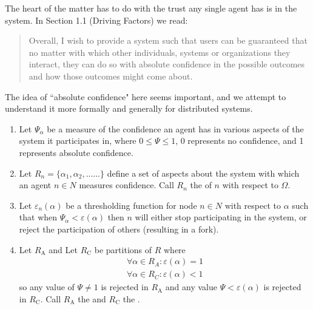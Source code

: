 \documentclass[twocolumn,showpacs,%
  nofootinbib,aps,superscriptaddress,%
  eqsecnum,prd,notitlepage,showkeys,10pt]{revtex4-1}
\begin{document}
The heart of the matter has to do with the trust any single agent has is in the system.  In \cite{yellowpaper} Section 1.1 (Driving Factors) we read:
\begin{quote}
Overall, I wish to provide a system such that users can be guaranteed that no matter with which other individuals, systems or organizations they interact, they can do so with absolute confidence in the possible outcomes and how those outcomes might come about.
\end{quote}

The idea of ``absolute confidence" here seems important, and we attempt to understand it more formally and generally for distributed systems.

\begin{enumerate}
\item Let $\Psi_\alpha$ be a measure of the confidence an agent has in various aspects of the system it participates in, where $0 \leq \Psi \leq 1$, 0 represents no confidence, and 1 represents absolute confidence.
\item Let $R_n = \{\alpha_1,\alpha_2,...\dots\}$ define a set of aspects about the system with which an agent $n \in N$ measures confidence.  Call $R_n$ the  of $n$ with respect to $\Omega$.
\item Let $\varepsilon_n(\alpha)$ be a thresholding function for node $n \in N$ with respect to $\alpha$ such that when $\Psi_\alpha < \varepsilon(\alpha)$ then $n$ will either stop participating in the system, or reject the participation of others (resulting in a fork).

\item  Let $R_\mathrm{A}$ and Let $R_\mathrm{C}$ be partitions of $R$ where
\begin{equation}
\begin{split}
\forall \alpha \in R_A:\varepsilon(\alpha)=1\\
\forall \alpha \in R_C:\varepsilon(\alpha)<1
\end{split}
\end{equation}
so any value of $\Psi \neq 1$ is rejected in $R_\mathrm{A}$ and any value $\Psi < \varepsilon(\alpha)$ is rejected in $R_\mathrm{C}$. Call $R_\mathrm{A}$ the  and $R_\mathrm{C}$ the .
\end{enumerate}
\end{document}
